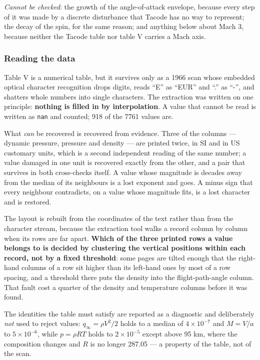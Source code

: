 \documentclass[11pt,a4paper]{article}
\begin{document}
\emph{Cannot be checked}: the growth of the angle-of-attack envelope, because every step
of it was made by a discrete disturbance that Tacode has no way to represent; the decay of
the spin, for the same reason; and anything below about Mach 3, because neither the Tacode
table nor table V carries a Mach axis.

\subsubsection{Reading the data}

Table V is a numerical table, but it survives only as a 1966 scan whose embedded
optical character recognition drops digits, reads ``E'' as ``EUR'' and ``.'' as ``-'', and
shatters whole numbers into single characters. The extraction was written on one
principle: \textbf{nothing is filled in by interpolation}. A value that cannot be read is
written as \texttt{nan} and counted; 918 of the 7761 values are.

What \emph{can} be recovered is recovered from evidence. Three of the columns --- dynamic
pressure, pressure and density --- are printed twice, in SI and in US customary units,
which is a second independent reading of the same number; a value damaged in one unit is
recovered exactly from the other, and a pair that survives in both cross-checks itself. A
value whose magnitude is decades away from the median of its neighbours is a lost
exponent and goes. A minus sign that every neighbour contradicts, on a value whose
magnitude fits, is a lost character and is restored.

The layout is rebuilt from the coordinates of the text rather than from the character
stream, because the extraction tool walks a record column by column when its rows are far
apart. \textbf{Which of the three printed rows a value belongs to is decided by clustering
the vertical positions within each record, not by a fixed threshold}: some pages are
tilted enough that the right-hand columns of a row sit higher than its left-hand ones by
most of a row spacing, and a threshold there puts the density into the flight-path-angle
column. That fault cost a quarter of the density and temperature columns before it was
found.

The identities the table must satisfy are reported as a diagnostic and deliberately
\emph{not} used to reject values: $q_\infty = \rho V^2/2$ holds to a median of
$4 \times 10^{-7}$ and $M = V/a$ to $5 \times 10^{-6}$, while $p = \rho R T$ holds to
$2 \times 10^{-5}$ except above 95 km, where the composition changes and $R$ is no longer
287.05 --- a property of the table, not of the scan.
\end{document}
